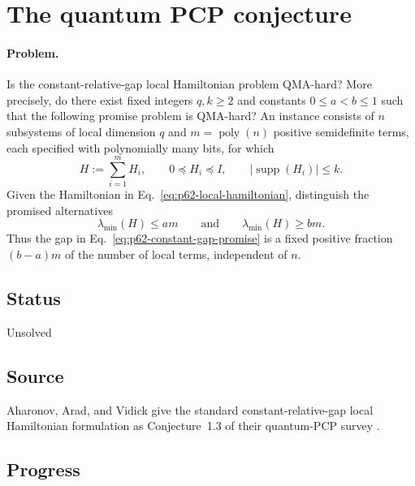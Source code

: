 \section{The quantum PCP conjecture}
\label{sec:problem-62}

\paragraph{Problem.}
Is the constant-relative-gap local Hamiltonian problem QMA-hard?  More
precisely, do there exist fixed integers $q,k\geq2$ and constants
$0\leq a<b\leq1$ such that the following promise problem is QMA-hard?  An
instance consists of $n$ subsystems of local dimension $q$ and
$m=\operatorname{poly}(n)$ positive semidefinite terms, each specified with
polynomially many bits, for which
\begin{equation}
  H:=\sum_{i=1}^{m}H_i,
  \qquad
  0\preceq H_i\preceq I,
  \qquad
  \lvert\operatorname{supp}(H_i)\rvert\leq k.
  \label{eq:p62-local-hamiltonian}
\end{equation}
Given the Hamiltonian in Eq.~\eqref{eq:p62-local-hamiltonian}, distinguish
the promised alternatives
\begin{equation}
  \lambda_{\min}(H)\leq am
  \qquad\text{and}\qquad
  \lambda_{\min}(H)\geq bm.
  \label{eq:p62-constant-gap-promise}
\end{equation}
Thus the gap in Eq.~\eqref{eq:p62-constant-gap-promise} is a fixed positive
fraction $(b-a)m$ of the number of local terms, independent of $n$.

\subsection*{Status}

Unsolved

\subsection*{Source}

Aharonov, Arad, and Vidick give the standard constant-relative-gap local
Hamiltonian formulation as Conjecture~1.3 of their quantum-PCP survey
.

\subsection*{Progress}


